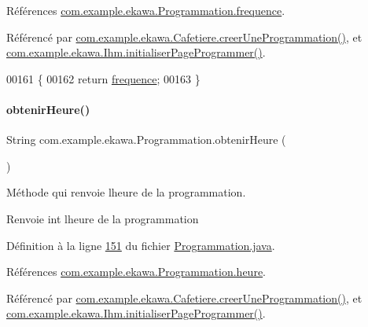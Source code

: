 Références \hyperlink{_programmation_8java_source_l00080}{com.\+example.\+ekawa.\+Programmation.\+frequence}.



Référencé par \hyperlink{_cafetiere_8java_source_l00731}{com.\+example.\+ekawa.\+Cafetiere.\+creer\+Une\+Programmation()}, et \hyperlink{_ihm_8java_source_l00668}{com.\+example.\+ekawa.\+Ihm.\+initialiser\+Page\+Programmer()}.


\begin{DoxyCode}
00161     \{
00162         \textcolor{keywordflow}{return} \hyperlink{classcom_1_1example_1_1ekawa_1_1_programmation_a6d0fd682b51727025ed8c4bf35fc8980}{frequence};
00163     \}
\end{DoxyCode}
\mbox{\label{classcom_1_1example_1_1ekawa_1_1_programmation_ad8930be27ca5d1eed33c5e6729735897}} 
\paragraph{\texorpdfstring{obtenir\+Heure()}{obtenirHeure()}}
{\footnotesize\ttfamily String com.\+example.\+ekawa.\+Programmation.\+obtenir\+Heure (\begin{DoxyParamCaption}{ }\end{DoxyParamCaption})}



Méthode qui renvoie l\textquotesingle{}heure de la programmation. 

\begin{DoxyReturn}{Renvoie}
int l\textquotesingle{}heure de la programmation 
\end{DoxyReturn}


Définition à la ligne \hyperlink{_programmation_8java_source_l00151}{151} du fichier \hyperlink{_programmation_8java_source}{Programmation.\+java}.



Références \hyperlink{_programmation_8java_source_l00079}{com.\+example.\+ekawa.\+Programmation.\+heure}.



Référencé par \hyperlink{_cafetiere_8java_source_l00731}{com.\+example.\+ekawa.\+Cafetiere.\+creer\+Une\+Programmation()}, et \hyperlink{_ihm_8java_source_l00668}{com.\+example.\+ekawa.\+Ihm.\+initialiser\+Page\+Programmer()}.


